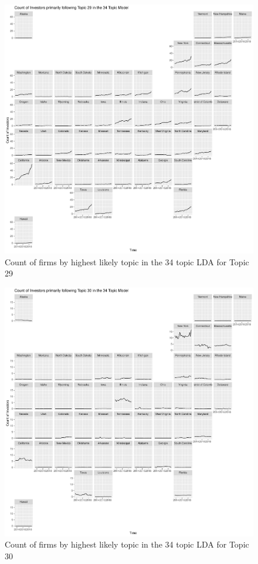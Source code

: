\begin{figure}
	\centering
	\includegraphics[width=1\linewidth]{Figures/ChapterV/USA_34_Topic29.pdf}
	\caption[Count of firm for Topic 29 by quarter]{Count of firms by highest likely topic in the 34 topic LDA for Topic 29}
	\label{fig:StateLDA29}
\end{figure}

\begin{figure}
	\centering
	\includegraphics[width=1\linewidth]{Figures/ChapterV/USA_34_Topic30.pdf}
	\caption[Count of firm for Topic 30 by quarter]{Count of firms by highest likely topic in the 34 topic LDA for Topic 30}
	\label{fig:StateLDA30}
\end{figure}

